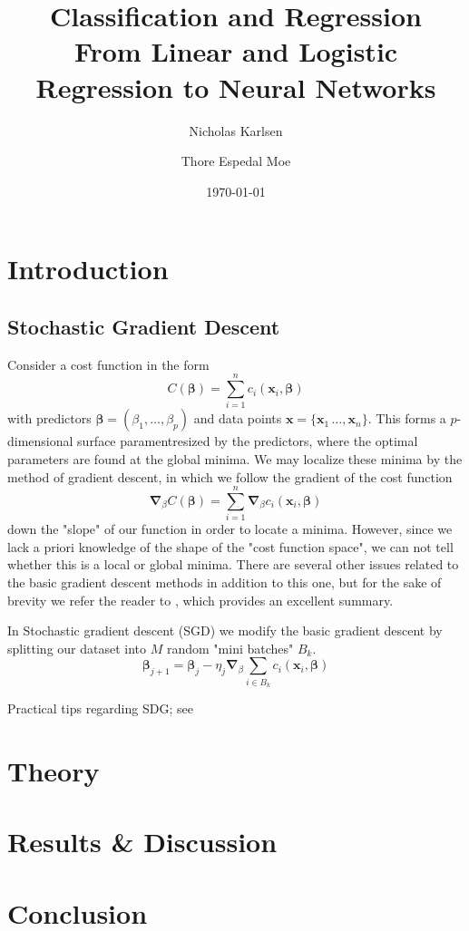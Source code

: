 \documentclass[reprint, english, nofootinbib]{revtex4-2}
\begin{document}
\title{Classification and Regression\\
\normalsize{From Linear and Logistic Regression to Neural Networks}}

\author{Nicholas Karlsen}
\author{Thore Espedal Moe}
\date{\today}

\begin{abstract}
\end{abstract}

\maketitle

\section{Introduction}
\subsection{Stochastic Gradient Descent}
\noindent
Consider a cost function in the form
\begin{equation}
    C(\pmb\beta) = \sum_{i=1}^{n}c_i(\pmb x_i, \pmb\beta)
\end{equation}
with predictors $\pmb \beta = (\beta_1, \dots, \beta_p)$ and data points $\pmb x = \{\pmb x_1\, \dots, \pmb x_n\}$. This forms a $p$-dimensional surface paramentresized by the predictors, where the optimal parameters are found at the  global minima. 
We may localize these minima by the method of gradient descent, in which we follow the gradient of the cost function
\begin{equation}
    \pmb\nabla_{\beta} C(\pmb\beta) = \sum_{i=1}^n \pmb\nabla_\beta c_i(\pmb x_i, \pmb\beta)
\end{equation}
down the "slope" of our function in order to locate a minima. However, since we lack a priori knowledge of the shape of the "cost function space", we can not tell whether this is a local or global minima. There are several other issues related to the basic gradient descent methods in addition to this one, but for the sake of brevity we refer the reader to \textcite[pp.15-16]{Mehta_2019}, which provides an excellent summary.

In Stochastic gradient descent (SGD) we modify the basic gradient descent by splitting our dataset into $M$ random "mini batches" $B_k$.
\begin{equation}
    \pmb\beta_{j + 1} = \pmb\beta_j - \eta_j\pmb\nabla_\beta\sum_{i\in B_k} c_i (\pmb x_i, \pmb \beta)
\end{equation}


Practical tips regarding SDG; see \textcite[pp~19]{Mehta_2019}
\section{Theory}
\section{Results \& Discussion}
\section{Conclusion}

\onecolumngrid

\newpage
\twocolumngrid
\appendix
\end{document}
